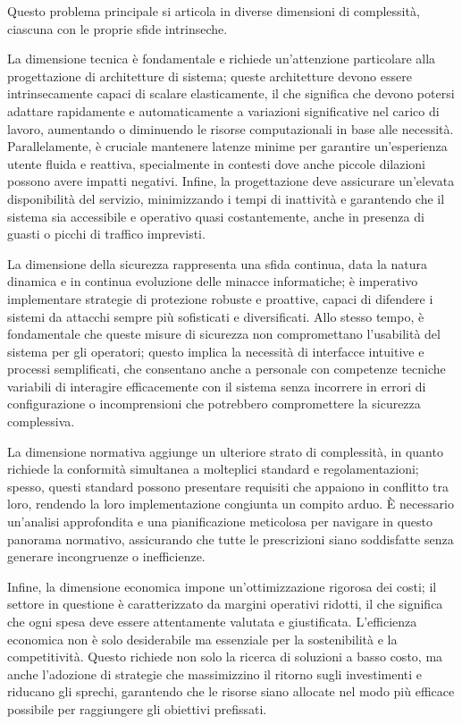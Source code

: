 Questo problema principale si articola in diverse dimensioni di complessità, ciascuna con le proprie sfide intrinseche.

La dimensione tecnica è fondamentale e richiede un'attenzione particolare alla progettazione di architetture di sistema; queste architetture devono essere intrinsecamente capaci di scalare elasticamente, il che significa che devono potersi adattare rapidamente e automaticamente a variazioni significative nel carico di lavoro, aumentando o diminuendo le risorse computazionali in base alle necessità. Parallelamente, è cruciale mantenere latenze minime per garantire un'esperienza utente fluida e reattiva, specialmente in contesti dove anche piccole dilazioni possono avere impatti negativi. Infine, la progettazione deve assicurare un'elevata disponibilità del servizio, minimizzando i tempi di inattività e garantendo che il sistema sia accessibile e operativo quasi costantemente, anche in presenza di guasti o picchi di traffico imprevisti.

La dimensione della sicurezza rappresenta una sfida continua, data la natura dinamica e in continua evoluzione delle minacce informatiche; è imperativo implementare strategie di protezione robuste e proattive, capaci di difendere i sistemi da attacchi sempre più sofisticati e diversificati. Allo stesso tempo, è fondamentale che queste misure di sicurezza non compromettano l'usabilità del sistema per gli operatori; questo implica la necessità di interfacce intuitive e processi semplificati, che consentano anche a personale con competenze tecniche variabili di interagire efficacemente con il sistema senza incorrere in errori di configurazione o incomprensioni che potrebbero compromettere la sicurezza complessiva.

La dimensione normativa aggiunge un ulteriore strato di complessità, in quanto richiede la conformità simultanea a molteplici standard e regolamentazioni; spesso, questi standard possono presentare requisiti che appaiono in conflitto tra loro, rendendo la loro implementazione congiunta un compito arduo. È necessario un'analisi approfondita e una pianificazione meticolosa per navigare in questo panorama normativo, assicurando che tutte le prescrizioni siano soddisfatte senza generare incongruenze o inefficienze.

Infine, la dimensione economica impone un'ottimizzazione rigorosa dei costi; il settore in questione è caratterizzato da margini operativi ridotti, il che significa che ogni spesa deve essere attentamente valutata e giustificata. L'efficienza economica non è solo desiderabile ma essenziale per la sostenibilità e la competitività. Questo richiede non solo la ricerca di soluzioni a basso costo, ma anche l'adozione di strategie che massimizzino il ritorno sugli investimenti e riducano gli sprechi, garantendo che le risorse siano allocate nel modo più efficace possibile per raggiungere gli obiettivi prefissati.

